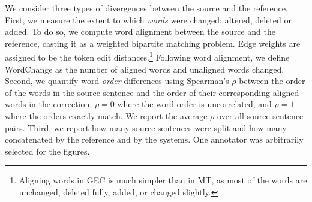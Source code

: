 \documentclass[11pt, a4paper]{article}
\begin{document}
We consider three types of divergences between the source and the reference.
First, we measure the extent to which \emph{words} were changed: altered, deleted or added.
To do so, we compute word alignment between the source and the reference, casting it
as a weighted bipartite matching problem. Edge weights are assigned to 
be the token edit distances.\footnote{Aligning words in GEC is much simpler than in MT, as most of the words are unchanged, deleted fully, added, or changed slightly.}
Following word alignment, we define {\sc WordChange}
as the number of aligned words and unaligned words changed.
Second, we quantify word \emph{order} differences using
Spearman's $\rho$ between the order of the words in the source sentence
and the order of their corresponding-aligned words in the correction.
$\rho=0$ where the word order is uncorrelated, and $\rho=1$ where the orders exactly match. We report the average $\rho$ over all source sentence pairs. 
Third, we report how many source sentences were split and how many concatenated by the reference and by the systems.
One annotator was arbitrarily selected for the figures.
\end{document}
